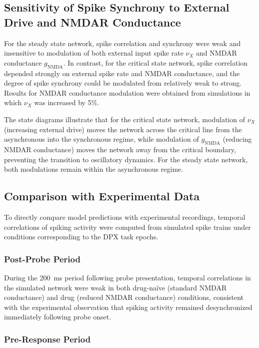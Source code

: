 \documentclass[12pt]{article}
\begin{document}
\subsection{Sensitivity of Spike Synchrony to External Drive and NMDAR Conductance}

For the steady state network, spike correlation and synchrony were weak and insensitive to modulation of both external input spike rate $\nu_X$ and NMDAR conductance $g_{\text{NMDA}}$. In contrast, for the critical state network, spike correlation depended strongly on external spike rate and NMDAR conductance, and the degree of spike synchrony could be modulated from relatively weak to strong. Results for NMDAR conductance modulation were obtained from simulations in which $\nu_X$ was increased by 5\%.

The state diagrams illustrate that for the critical state network, modulation of $\nu_X$ (increasing external drive) moves the network across the critical line from the asynchronous into the synchronous regime, while modulation of $g_{\text{NMDA}}$ (reducing NMDAR conductance) moves the network away from the critical boundary, preventing the transition to oscillatory dynamics. For the steady state network, both modulations remain within the asynchronous regime.

\subsection{Comparison with Experimental Data}

To directly compare model predictions with experimental recordings, temporal correlations of spiking activity were computed from simulated spike trains under conditions corresponding to the DPX task epochs.

\subsubsection{Post-Probe Period}

During the 200~ms period following probe presentation, temporal correlations in the simulated network were weak in both drug-na\"ive (standard NMDAR conductance) and drug (reduced NMDAR conductance) conditions, consistent with the experimental observation that spiking activity remained desynchronized immediately following probe onset.

\subsubsection{Pre-Response Period}
\end{document}
